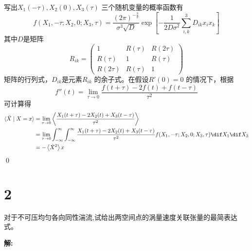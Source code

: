 \documentclass[12pt,a4]{ctexart}
\begin{document}
写出$X_1(-\tau),X_2(0),X_3(\tau)$ 三个随机变量的概率函数有
\begin{equation}
   f(X_1,-\tau;X_2,0;X_3,\tau) = \frac{(2\pi)^{-\frac{3}{2}}}{\sigma^3\sqrt{D}}\exp \left[ - \frac{1}{2D\sigma^2} \sum_{i,k}^3 D_{ik} x_i x_k \right]
\end{equation}
其中$D$是矩阵
\begin{equation}
   R_{ik} =
   \begin{pmatrix}
      1        & R(\tau) & R(2\tau) \\
      R(\tau)  & 1       & R(\tau)  \\
      R(2\tau) & R(\tau) & 1
   \end{pmatrix}
\end{equation}
矩阵的行列式，$D_{ik}$是元素$R_{ik}$ 的余子式。在假设$R'(0) = 0$ 的情况下，根据
\begin{equation}
   f''(t) = \lim_{\tau\to 0} \frac{f(t+\tau) - 2f(t) + f(t-\tau)}{\tau^2}
\end{equation}
可计算得
\begin{equation}
   \begin{aligned}
      \langle\ddot{X} \mid X=x\rangle & = \lim_{\tau\to 0} \left<  \frac{X_{1}(t+\tau) - 2X_2(t) + X_3(t-\tau)}{\tau^2}	\right>                                                                                 \\
                                      & = \lim_{\tau\to 0} \int_{-\infty}^{\infty} \int_{-\infty}^{\infty}  \frac{X_{1}(t+\tau) - 2X_2(t) + X_3(t-\tau)}{\tau^2} f(X_1,-\tau;X_2,0;X_3,\tau) \dif X_1 \dif X_3 \\
                                      & = - \left< \dot{X}^2 \right> x                                                                                                                                         \\
   \end{aligned}
\end{equation} \qed





\section{2}
对于不可压均匀各向同性湍流,试给出两空间点的涡量速度关联张量的最简表达式。

\textsf{\hspace{-2em}\sf  \textbf{解:}}
\end{document}
